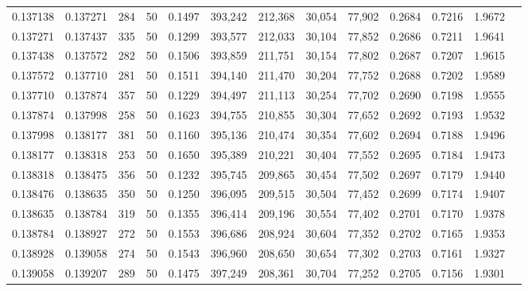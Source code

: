 \begin{tabular}{rrrrrrrrrrrrr}
0.137138 & 0.137271 &   284 &  50 &                                     0.1497 & 393,242 & 212,368 &  30,054 &  77,902 & 0.2684 & 0.7216 & 1.9672 \\
0.137271 & 0.137437 &   335 &  50 &                                     0.1299 & 393,577 & 212,033 &  30,104 &  77,852 & 0.2686 & 0.7211 & 1.9641 \\
0.137438 & 0.137572 &   282 &  50 &                                     0.1506 & 393,859 & 211,751 &  30,154 &  77,802 & 0.2687 & 0.7207 & 1.9615 \\
0.137572 & 0.137710 &   281 &  50 &                                     0.1511 & 394,140 & 211,470 &  30,204 &  77,752 & 0.2688 & 0.7202 & 1.9589 \\
0.137710 & 0.137874 &   357 &  50 &                                     0.1229 & 394,497 & 211,113 &  30,254 &  77,702 & 0.2690 & 0.7198 & 1.9555 \\
0.137874 & 0.137998 &   258 &  50 &                                     0.1623 & 394,755 & 210,855 &  30,304 &  77,652 & 0.2692 & 0.7193 & 1.9532 \\
0.137998 & 0.138177 &   381 &  50 &                                     0.1160 & 395,136 & 210,474 &  30,354 &  77,602 & 0.2694 & 0.7188 & 1.9496 \\
0.138177 & 0.138318 &   253 &  50 &                                     0.1650 & 395,389 & 210,221 &  30,404 &  77,552 & 0.2695 & 0.7184 & 1.9473 \\
0.138318 & 0.138475 &   356 &  50 &                                     0.1232 & 395,745 & 209,865 &  30,454 &  77,502 & 0.2697 & 0.7179 & 1.9440 \\
0.138476 & 0.138635 &   350 &  50 &                                     0.1250 & 396,095 & 209,515 &  30,504 &  77,452 & 0.2699 & 0.7174 & 1.9407 \\
0.138635 & 0.138784 &   319 &  50 &                                     0.1355 & 396,414 & 209,196 &  30,554 &  77,402 & 0.2701 & 0.7170 & 1.9378 \\
0.138784 & 0.138927 &   272 &  50 &                                     0.1553 & 396,686 & 208,924 &  30,604 &  77,352 & 0.2702 & 0.7165 & 1.9353 \\
0.138928 & 0.139058 &   274 &  50 &                                     0.1543 & 396,960 & 208,650 &  30,654 &  77,302 & 0.2703 & 0.7161 & 1.9327 \\
0.139058 & 0.139207 &   289 &  50 &                                     0.1475 & 397,249 & 208,361 &  30,704 &  77,252 & 0.2705 & 0.7156 & 1.9301 \\

\end{tabular}
